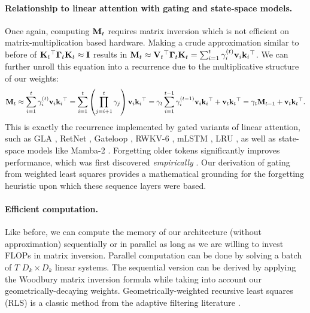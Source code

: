 \documentclass[notitlepage, 11pt]{article}
\newcommand*{\dkey}{{D_k}}
\begin{document}
\paragraph{Relationship to linear attention with gating and state-space models.}
Once again, computing $\mathbf{M}_t$ requires matrix inversion which is not efficient on matrix-multiplication based hardware.
Making a crude approximation similar to before of $\mathbf{K}_t{}^\top\boldsymbol{\Gamma}_t\mathbf{K}_t\approx \mathbf{I}$ results in $\mathbf{M}_t \approx \mathbf{V}_t{}^\top \boldsymbol{\Gamma}_t\mathbf{K}_t = \sum_{i=1}^t \gamma_i^{(t)} \mathbf{v}_i\mathbf{k}_i{}^\top$.
We can further unroll this equation into a recurrence due to the multiplicative structure of our weights:
\begin{align}
    \mathbf{M}_t \approx \sum_{i=1}^t \gamma_i^{(t)} \mathbf{v}_i\mathbf{k}_i{}^\top
    = \sum_{i=1}^t \left(\prod_{j=i+1}^t \gamma_j\right) \mathbf{v}_i\mathbf{k}_i{}^\top 
    = \gamma_t \sum_{i=1}^{t-1} \gamma_i^{(t-1)} \mathbf{v}_i\mathbf{k}_i{}^\top  + \mathbf{v}_t\mathbf{k}_t{}^\top
    = \gamma_t \mathbf{M}_{t-1} + \mathbf{v}_t\mathbf{k}_t{}^\top.
\end{align}
This is exactly the recurrence implemented by gated variants of linear attention, such as GLA \citep{Yang2024GatedLinearAttention}, RetNet \citep{Sun2023RetentiveNetworkSuccessor}, Gateloop \citep{Katsch2024GateLoopFullyDataControlled}, RWKV-6 \citep{Peng2024EagleFinchRWKV}, mLSTM \citep{Beck2024XLSTMExtendedLong}, LRU \citep{Orvieto2023ResurrectingRecurrentNeural}, as well as state-space models like Mamba-2 \citep{Dao2024TransformersAreSSMs}.
Forgetting older tokens significantly improves performance, which was first discovered \emph{empirically} \citep{Hochreiter1997LongShortTermMemory,Greff2017LSTMSearchSpace,vanderWesthuizen2018UnreasonableEffectivenessForget}.
Our derivation of gating from weighted least squares provides a mathematical grounding for the forgetting heuristic upon which these sequence layers were based.

\paragraph{Efficient computation.}
Like before, we can compute the memory of our architecture (without approximation) sequentially or in parallel as long as we are willing to invest FLOPs in matrix inversion.
Parallel computation can be done by solving a batch of $T$ $\dkey\times \dkey$ linear systems.
The sequential version can be derived by applying the Woodbury matrix inversion formula while taking into account our geometrically-decaying weights.
Geometrically-weighted recursive least squares (RLS) is a classic method from the adaptive filtering literature \citep{Johnstone1982ExponentialConvergenceRecursive}.
\end{document}
